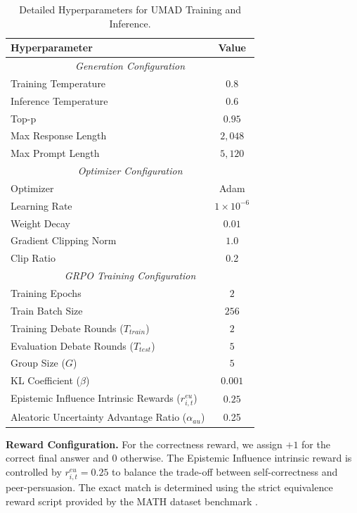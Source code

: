 \documentclass{article}
\theoremstyle{plain}
\theoremstyle{definition}
\theoremstyle{remark}
\begin{document}
\begin{table}[h]
\centering
\caption{Detailed Hyperparameters for UMAD Training and Inference.}
\label{tab:hyperparameters}
\begin{small}
\begin{tabular}{l|c}
\toprule
\textbf{Hyperparameter} & \textbf{Value} \\
\midrule
\multicolumn{2}{c}{\textit{Generation Configuration}} \\
\midrule
Training Temperature & $0.8$ \\
Inference Temperature & $0.6$ \\
Top-p & $0.95$ \\
Max Response Length & $2,048$ \\
Max Prompt Length & $5,120$ \\
\midrule
\multicolumn{2}{c}{\textit{Optimizer Configuration}} \\
\midrule
Optimizer & Adam \\
Learning Rate & $1 \times 10^{-6}$ \\
Weight Decay & $0.01$ \\
Gradient Clipping Norm & $1.0$ \\
Clip Ratio & 0.2 \\
\midrule
\multicolumn{2}{c}{\textit{GRPO Training Configuration}} \\
\midrule
Training Epochs & $2$ \\
Train Batch Size & $256$ \\
Training Debate Rounds ($T_{train}$) & $2$ \\
Evaluation Debate Rounds ($T_{test}$) & $5$ \\
Group Size ($G$) & $5$ \\
KL Coefficient ($\beta$) & $0.001$ \\
Epistemic Influence Intrinsic Rewards ($r_{i,t}^{eu}$) & $0.25$ \\
Aleatoric Uncertainty Advantage Ratio ($\alpha_{au}$) & 0.25 \\
\bottomrule
\end{tabular}
\end{small}
\end{table}

\textbf{Reward Configuration.} 
For the correctness reward, we assign $+1$ for the correct final answer and $0$ otherwise. The Epistemic Influence intrinsic reward is controlled by $r_{i,t}^{eu}=0.25$ to balance the trade-off between self-correctness and peer-persuasion. The exact match is determined using the strict equivalence reward script provided by the MATH dataset benchmark \cite{hendrycks2021measuring}.
\end{document}
